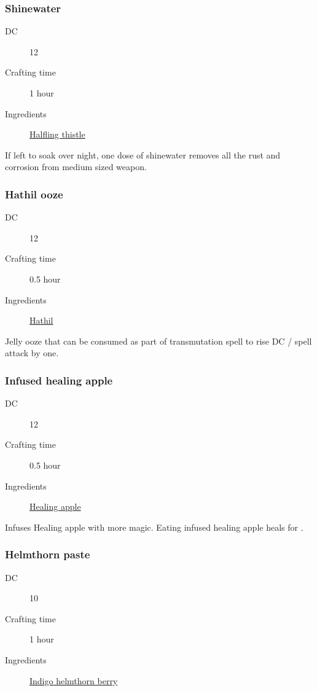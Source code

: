 \subsubsection{Shinewater}
\label{Shinewater}

\begin{description}
\item [DC] 12
\item [Crafting time] 1 hour
\item [Ingredients] \hyperref[Halfling Thistle]{Halfling thistle}
\end{description}

If left to soak over night, one dose of shinewater removes all the rust and corrosion 
from medium sized weapon.

\subsubsection{Hathil ooze}
\label{Hathil ooze}

\begin{description}
\item [DC] 12
\item [Crafting time] 0.5 hour
\item [Ingredients] \hyperref[Hathil]{Hathil}
\end{description}

Jelly ooze that can be consumed as part of transmutation spell to rise DC / spell attack by one.

\subsubsection{Infused healing apple}
\label{Infused healing apple}

\begin{description}
\item [DC] 12
\item [Crafting time] 0.5 hour
\item [Ingredients] \hyperref[Healing Apple Tree]{Healing apple}
\end{description}

Infuses Healing apple with more magic. Eating infused healing apple heals for .

\subsubsection{Helmthorn paste}
\label{Helmthorn paste}

\begin{description}
\item [DC] 10
\item [Crafting time] 1 hour
\item [Ingredients] \hyperref[Helmthorn]{Indigo helmthorn berry}
\end{description}


